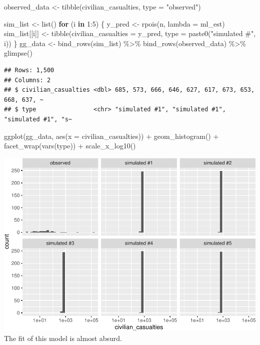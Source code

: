 \documentclass[
]{book}
\newenvironment{Shaded}{\begin{snugshade}}{\end{snugshade}}
\newcommand{\AttributeTok}[1]{\textcolor[rgb]{0.77,0.63,0.00}{#1}}
\newcommand{\ControlFlowTok}[1]{\textcolor[rgb]{0.13,0.29,0.53}{\textbf{#1}}}
\newcommand{\DecValTok}[1]{\textcolor[rgb]{0.00,0.00,0.81}{#1}}
\newcommand{\FunctionTok}[1]{\textcolor[rgb]{0.00,0.00,0.00}{#1}}
\newcommand{\NormalTok}[1]{#1}
\newcommand{\OtherTok}[1]{\textcolor[rgb]{0.56,0.35,0.01}{#1}}
\newcommand{\SpecialCharTok}[1]{\textcolor[rgb]{0.00,0.00,0.00}{#1}}
\newcommand{\StringTok}[1]{\textcolor[rgb]{0.31,0.60,0.02}{#1}}
\begin{document}
\begin{Shaded}
\begin{Highlighting}[]
\NormalTok{observed\_data }\OtherTok{\textless{}{-}} \FunctionTok{tibble}\NormalTok{(civilian\_casualties, }\AttributeTok{type =} \StringTok{"observed"}\NormalTok{)}

\NormalTok{sim\_list }\OtherTok{\textless{}{-}} \FunctionTok{list}\NormalTok{()}
\ControlFlowTok{for}\NormalTok{ (i }\ControlFlowTok{in} \DecValTok{1}\SpecialCharTok{:}\DecValTok{5}\NormalTok{) \{}
\NormalTok{  y\_pred }\OtherTok{\textless{}{-}} \FunctionTok{rpois}\NormalTok{(n, }\AttributeTok{lambda =}\NormalTok{ ml\_est)}
\NormalTok{  sim\_list[[i]] }\OtherTok{\textless{}{-}} \FunctionTok{tibble}\NormalTok{(}\AttributeTok{civilian\_casualties =}\NormalTok{ y\_pred, }
                          \AttributeTok{type =} \FunctionTok{paste0}\NormalTok{(}\StringTok{"simulated \#"}\NormalTok{, i))}
\NormalTok{\}}
\NormalTok{gg\_data }\OtherTok{\textless{}{-}} \FunctionTok{bind\_rows}\NormalTok{(sim\_list) }\SpecialCharTok{\%\textgreater{}\%}
  \FunctionTok{bind\_rows}\NormalTok{(observed\_data) }\SpecialCharTok{\%\textgreater{}\%}
  \FunctionTok{glimpse}\NormalTok{()}
\end{Highlighting}
\end{Shaded}

\begin{verbatim}
## Rows: 1,500
## Columns: 2
## $ civilian_casualties <dbl> 685, 573, 666, 646, 627, 617, 673, 653, 668, 637, ~
## $ type                <chr> "simulated #1", "simulated #1", "simulated #1", "s~
\end{verbatim}

\begin{Shaded}
\begin{Highlighting}[]
\FunctionTok{ggplot}\NormalTok{(gg\_data, }\FunctionTok{aes}\NormalTok{(}\AttributeTok{x =}\NormalTok{ civilian\_casualties)) }\SpecialCharTok{+} 
  \FunctionTok{geom\_histogram}\NormalTok{() }\SpecialCharTok{+} 
  \FunctionTok{facet\_wrap}\NormalTok{(}\FunctionTok{vars}\NormalTok{(type)) }\SpecialCharTok{+} 
  \FunctionTok{scale\_x\_log10}\NormalTok{()}
\end{Highlighting}
\end{Shaded}

\includegraphics{01-05-predictive-distribution_files/figure-latex/unnamed-chunk-6-1.pdf}
The fit of this model is almost absurd.
\end{document}
